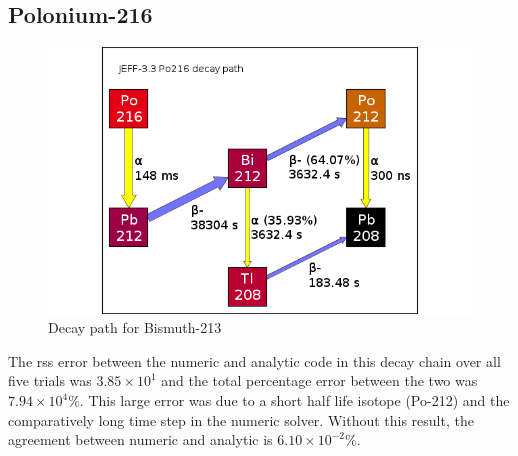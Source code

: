 \clearpage
\subsection{Polonium-216}
\FloatBarrier

\begin{figure}[!h]
\centering
		\includegraphics[width=.4\linewidth]{appendix/activity_equation/decay_paths/84po216_decay.png}
		\caption{Decay path for Bismuth-213 \cite{jeff311}}
		\label{fig:decaybi213}
\end{figure}
\FloatBarrier

The \acrshort{rss} error between the numeric and analytic code in this decay chain over all five trials was $3.85 \times 10^{1}$ and the total percentage error between the two was $7.94 \times 10^{4}\%$.  This large error was due to a short half life isotope (Po-212) and the comparatively long time step in the numeric solver.  Without this result, the agreement between numeric and analytic is $6.10 \times 10^{-2}\%$.

